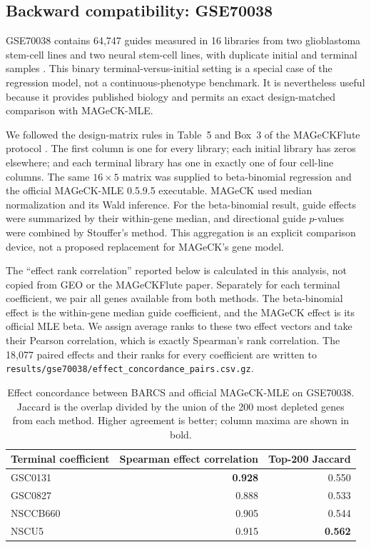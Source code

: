 \subsection{Backward compatibility: GSE70038}

GSE70038 contains 64,747 guides measured in 16 libraries from two glioblastoma
stem-cell lines and two neural stem-cell lines, with duplicate initial and
terminal samples \citep{toledo2015pkmyt1}.  This binary terminal-versus-initial
setting is a special case of the regression model, not a continuous-phenotype
benchmark.  It is nevertheless useful because it provides published biology
and permits an exact design-matched comparison with MAGeCK-MLE.

We followed the design-matrix rules in Table~5 and Box~3 of the MAGeCKFlute
protocol \citep{wang2019mageckflute}.  The first column is one for every
library; each initial library has zeros elsewhere; and each terminal library
has one in exactly one of four cell-line columns.  The same $16\times5$ matrix
was supplied to beta-binomial regression and the official MAGeCK-MLE 0.5.9.5
executable.  MAGeCK used median normalization and its Wald inference.  For the
beta-binomial result, guide effects were summarized by their within-gene
median, and directional guide $p$-values were combined by Stouffer's method.
This aggregation is an explicit comparison device, not a proposed replacement
for MAGeCK's gene model.

The ``effect rank correlation'' reported below is calculated in this analysis,
not copied from GEO or the MAGeCKFlute paper.  Separately for each terminal
coefficient, we pair all genes available from both methods.  The
beta-binomial effect is the within-gene median guide coefficient, and the
MAGeCK effect is its official MLE beta.  We assign average ranks to these two
effect vectors and take their Pearson correlation, which is exactly Spearman's
rank correlation.  The 18,077 paired effects and their ranks for every
coefficient are written to
\texttt{results/gse70038/effect\_concordance\_pairs.csv.gz}.

\begin{table}[ht]
\centering
\caption{Effect concordance between  BARCS and
 official MAGeCK-MLE on GSE70038.  Jaccard is the
overlap divided by the union of the 200 most depleted genes from each method.
Higher agreement is better; column maxima are shown in bold.}
\label{tab:gse}
\begin{tabular}{lrr}
\toprule
Terminal coefficient & Spearman effect correlation & Top-200 Jaccard\\
\midrule
GSC0131 & \textbf{0.928} & 0.550\\
GSC0827 & 0.888 & 0.533\\
NSCCB660 & 0.905 & 0.544\\
NSCU5 & 0.915 & \textbf{0.562}\\
\bottomrule
\end{tabular}
\end{table}

